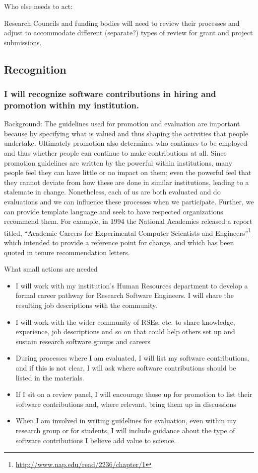 \documentclass[a4paper,UKenglish]{dagman}
\renewcommand{\paragraph}[1]{\subsubsection*{#1}\xspace}
\begin{document}
Who else needs to act:

Research Councils and funding bodies will need to review their processes and adjust to accommodate different (separate?) types of review for grant and project submissions.




\subsection{Recognition}

\paragraph{I will recognize software contributions in hiring and promotion within my institution.}

Background:
The guidelines used for promotion and evaluation are important because by specifying what is valued and thus shaping the activities that people undertake. Ultimately promotion also determines who continues to be employed and thus whether people can continue to make contributions at all. Since promotion guidelines are written by the powerful within institutions, many people feel they can have little or no impact on them; even the powerful feel that they cannot deviate from how these are done in similar institutions, leading to a stalemate in change. Nonetheless, each of us are both evaluated and do evaluations and we can influence these processes when we participate. Further, we can provide template language and seek to have respected organizations recommend them. For example, in 1994 the National Academies released a report titled, ``Academic Careers for Experimental Computer Scientists and Engineers''\footnote{\url{http://www.nap.edu/read/2236/chapter/1}} which intended to provide a reference point for change, and which has been quoted in tenure recommendation letters.

What small actions are needed
\begin{itemize}
\item I will work with my institution's Human Resources department to develop a formal career pathway for Research Software Engineers. I will share the resulting job descriptions with the community.
\item I will work with the wider community of RSEs, etc. to share knowledge, experience, job descriptions and so on that could help others set up and sustain research software groups and careers
\item During processes where I am evaluated, I will list my software contributions, and if this is not clear, I will ask where software contributions should be listed in the materials.
\item If I sit on a review panel, I will encourage those up for promotion to list their software contributions and, where relevant, bring them up in discussions
\item When I am involved in writing guidelines for evaluation, even within my research group or for students, I will include guidance about the type of software contributions I believe add value to science. 
\end{itemize}
\end{document}
